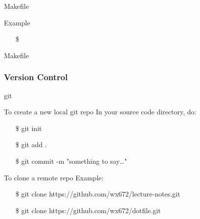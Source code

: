 \begin{frame}{Makefile}
  \begin{block}{}
  \end{block}
  \begin{block}{Example}
  \end{block}
  \begin{itemize}
  \item[\$] 
  \end{itemize}
\end{frame}

\begin{frame}{Makefile}
  \begin{minipage}{.75\linewidth}
  \end{minipage}
  \begin{minipage}{.2\linewidth}
    \begin{center}
    \end{center}
  \end{minipage}
\end{frame}

\subsubsection{Version Control}
\label{sec:version-control}

\begin{frame}{git}
  \begin{block}{To create a new local git repo}
    In your source code directory, do:\ttfamily
    \begin{itemize}
    \item[\$] git init
    \item[\$] git add .
    \item[\$] git commit -m "something to say\ldots"
    \end{itemize}
  \end{block}
  \begin{block}{To clone a remote repo}
    Example:\ttfamily
    \begin{itemize}
    \item[\$] git clone https://github.com/wx672/lecture-notes.git
    \item[\$] git clone https://github.com/wx672/dotfile.git
    \end{itemize}
  \end{block}
\end{frame}

